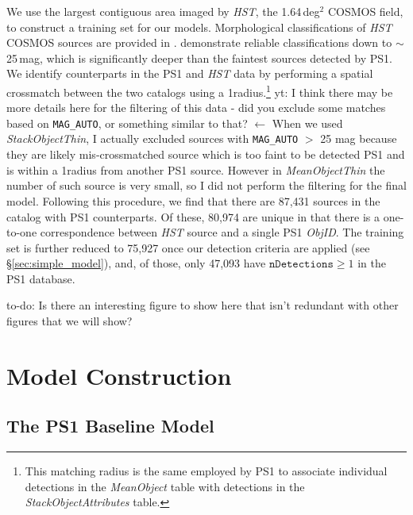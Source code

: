 \documentclass[twocolumn]{aastex62}
\newcommand{\yutaro}[1]{{\color{red} yt: {#1}}}
\newcommand{\todo}[1]{{\color{magenta} to-do: {#1}}}
\begin{document}
We use the largest contiguous area imaged by \textit{HST}, the 1.64\,deg$^2$
COSMOS field, to construct a training set for our models. Morphological
classifications of \textit{HST} COSMOS sources are provided in
\citet{Leauthaud07}. \citeauthor{Leauthaud07} demonstrate reliable
classifications down to $\sim$25\,mag, which is significantly deeper than the
faintest sources detected by PS1. We identify counterparts in the PS1 and
\textit{HST} data by performing a spatial crossmatch between the two catalogs
using a 1\arcsec radius.\footnote{This matching radius is the same employed
by PS1 to associate individual detections in the \textit{MeanObject} table
with detections in the \textit{StackObjectAttributes} table.} 
\yutaro{I think
there may be more details here for the filtering of this data - did you
exclude some matches based on \texttt{MAG\_AUTO}, or something similar to
that?
$\leftarrow$ When we used \textit{StackObjectThin}, 
I actually excluded sources with \texttt{MAG\_AUTO} $>$ 25 mag 
because they are likely mis-crossmatched source 
which is too faint to be detected PS1 and is within a 1\arcsec radius 
from another PS1 source. 
However in \textit{MeanObjectThin} the number of such source is very small, 
so I did not perform the filtering for the final model.} 
Following this procedure, we find that there are 87,431 sources in the
\citet{Leauthaud07} catalog with PS1 counterparts. Of these, 80,974 are
unique in that there is a one-to-one correspondence between \textit{HST}
source and a single PS1 \textit{ObjID}. The training set is further reduced
to 75,927 once our detection criteria are applied (see
\S\ref{sec:simple_model}), and, of those, only 47,093 have
$\texttt{nDetections} \ge 1$ in the PS1 database.

\todo{Is there an interesting figure to show here that isn't redundant with other figures that we will show?}


\section{Model Construction}
\subsection{The PS1 Baseline Model}\label{sec:ps1_model}
\end{document}
